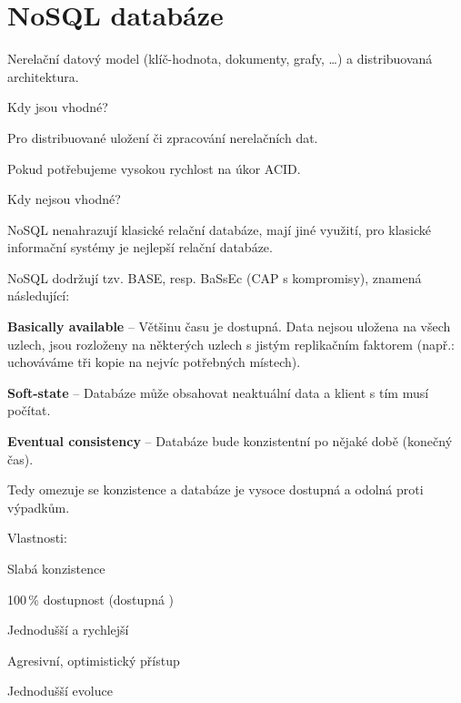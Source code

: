 
\section{NoSQL databáze}

\begin{compactitem}
    \item Nerelační datový model (klíč-hodnota, dokumenty, grafy, \dots) a distribuovaná architektura.

    \item Kdy jsou vhodné? \begin{compactitem}
        \item Pro distribuované uložení či zpracování nerelačních dat.
        \item Pokud potřebujeme vysokou rychlost na úkor ACID.
    \end{compactitem}

    \item Kdy nejsou vhodné? \begin{compactitem}
        \item NoSQL nenahrazují klasické relační databáze, mají jiné využití, pro klasické informační systémy je nejlepší relační databáze.
    \end{compactitem}

    \item NoSQL dodržují tzv. BASE, resp. BaSsEc (CAP s kompromisy), znamená následující: \begin{compactitem}
        \item \textbf{Basically available} -- Většinu času je dostupná. Data nejsou uložena na všech uzlech, jsou rozloženy na některých uzlech s jistým replikačním faktorem (např.: uchováváme tři kopie na nejvíc potřebných místech).

        \item \textbf{Soft-state} -- Databáze může obsahovat neaktuální data a klient s tím musí počítat.

        \item \textbf{Eventual consistency} -- Databáze bude konzistentní po nějaké době (konečný čas).
    \end{compactitem}

    \item Tedy omezuje se konzistence a databáze je vysoce dostupná a odolná proti výpadkům.

    \item Vlastnosti: \begin{compactitem}
        \item Slabá konzistence
        \item 100\,\% dostupnost (dostupná )
        \item Jednodušší a rychlejší
        \item Agresivní, optimistický přístup
        \item Jednodušší evoluce
    \end{compactitem}


\end{compactitem}
